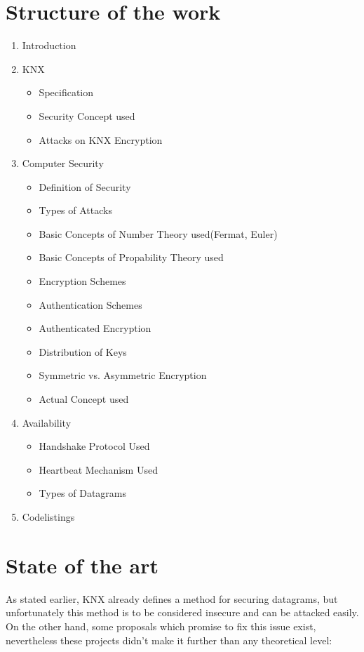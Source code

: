 \documentclass[a4paper,12pt,twoside]{memoir}
\begin{document}
\section{Structure of the work}
\begin{enumerate}
 \item Introduction
 \item KNX
 \begin{itemize}
  \item Specification
  \item Security Concept used
  \item Attacks on KNX Encryption
 \end{itemize}
 
 \item Computer Security
 \begin{itemize}
 \item Definition of Security
  \item Types of Attacks
  \item Basic Concepts of Number Theory used(Fermat, Euler)
  \item Basic Concepts of Propability Theory used
  \item Encryption Schemes
  \item Authentication Schemes
  \item Authenticated Encryption
  \item Distribution of Keys
  \item Symmetric vs. Asymmetric Encryption
  \item Actual Concept used
 \end{itemize}
 \item Availability
 \begin{itemize}
  \item Handshake Protocol Used
  \item Heartbeat Mechanism Used
  \item Types of Datagrams
 \end{itemize}
 \item Codelistings

\end{enumerate}
  
\section{State of the art}

As stated earlier, KNX already defines a method for securing datagrams, but unfortunately this method is
to be considered insecure and can be attacked easily.
On the other hand, some proposals which promise to fix this issue exist, nevertheless these projects didn't
make it further than any theoretical level:
\end{document}
